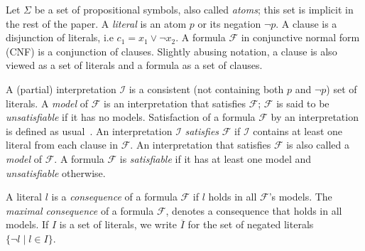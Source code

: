 \documentclass[twoside,11pt]{article}
\newcommand\m[1]{\mathcal{#1}}
\newcommand\comment[1]{\marginpar{\tiny #1}}
\renewcommand\comment[1]{#1}
\newcommand{\emilio}[1]{{\comment{\color{red}Emilio: #1}}}
\newcommand{\bart}[1]{{\comment{\color{OliveGreen}Bart: #1}}}
\newcommand\Iend{\ensuremath{I_\mathit{end} }\xspace}
\newcommand\formula{\ensuremath{\m{F} }\xspace}
\newcommand\mm[1]{\ensuremath{#1}\xspace}
\newcommand\voc{\ensuremath{\Sigma}\xspace}
\newcommand\negset[1]{\mm{\overline{#1}}}
\begin{document}
Let \voc be a set of propositional symbols, also called \emph{atoms}; this set is implicit in the rest of the paper. A \emph{literal} is an atom $p$ or its negation $\lnot p$. 
A clause is a disjunction of literals, i.e $c_1 = x_1 \vee \lnot x_2 $. A formula $\formula$ in conjunctive normal form (CNF) is a conjunction of clauses. 
Slightly abusing notation, a clause is also viewed as a set of literals and a formula as a set of clauses. 

A (partial) interpretation $\m{I}$ is a consistent (not containing both $p$ and $\lnot p$) set of literals. 
A \emph{model} of \formula is an interpretation that satisfies \formula; $\formula$ is said to be \emph{unsatisfiable} if it has no models.
Satisfaction of a formula \formula by an interpretation is defined as usual~\cite{faia/2009-185}.
An interpretation $\m{I}$ \emph{satisfies} \formula if $\m{I}$ contains at least one literal from each clause in $\formula$.
An interpretation that satisfies $\formula$ is also called a \emph{model} of \formula. 
A formula \formula is \emph{satisfiable} if it has at least one model and \emph{unsatisfiable} otherwise. 

A literal $l$ is a \emph{consequence} of a formula \formula if $l$ holds in all $\formula$'s models. The \emph{maximal consequence} of a formula \formula, denotes a consequence that holds in all models.
If $I$ is a set of literals, we write $\negset{I}$ for the set of negated literals $\{\lnot l\mid l\in I\}$.
\end{document}
